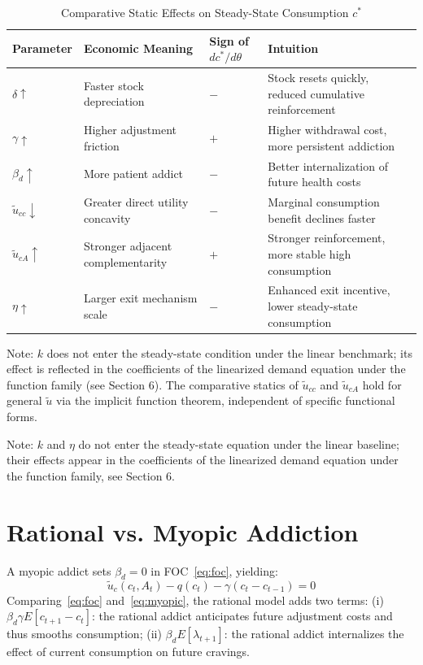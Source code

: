 \documentclass[12pt]{article}
\begin{document}
\begin{table}[h]
\centering
\caption{Comparative Static Effects on Steady-State Consumption $c^*$}
\begin{tabular}{llll}
\toprule
Parameter & Economic Meaning & Sign of $dc^*/d\theta$ & Intuition \\
\midrule
$\delta \uparrow$ & Faster stock depreciation
    & $-$ & Stock resets quickly, reduced cumulative reinforcement \\
$\gamma \uparrow$ & Higher adjustment friction
    & $+$ & Higher withdrawal cost, more persistent addiction \\
$\beta_d \uparrow$ & More patient addict
    & $-$ & Better internalization of future health costs \\
$\tilde{u}_{cc} \downarrow$ & Greater direct utility concavity
    & $-$ & Marginal consumption benefit declines faster \\
$\tilde{u}_{cA} \uparrow$ & Stronger adjacent complementarity
    & $+$ & Stronger reinforcement, more stable high consumption \\
$\eta \uparrow$ & Larger exit mechanism scale
    & $-$ & Enhanced exit incentive, lower steady-state consumption \\
\bottomrule
\end{tabular}
 
\smallskip
\footnotesize
Note: $k$ does not enter the steady-state condition under the linear benchmark; its effect is reflected in the
coefficients of the linearized demand equation under the function family (see Section 6). The comparative statics of $\tilde{u}_{cc}$ and $\tilde{u}_{cA}$
hold for general $\tilde{u}$ via the implicit function theorem, independent of specific functional forms.
\end{table}

\small Note: $k$ and $\eta$ do not enter the steady-state equation under the linear baseline;
their effects appear in the coefficients of the linearized demand equation under the function family, see Section 6.

\section{Rational vs. Myopic Addiction}

A myopic addict sets $\beta_d = 0$ in FOC~\eqref{eq:foc}, yielding:
\begin{equation}\label{eq:myopic}
\tilde{u}_c(c_t, A_t) - q(c_t) - \gamma(c_t - c_{t-1}) = 0
\end{equation}
Comparing~\eqref{eq:foc} and~\eqref{eq:myopic}, the rational model adds two terms: (i) $\beta_d\gamma E[c_{t+1} - c_t]$:
the rational addict anticipates future adjustment costs and thus smooths consumption; (ii) $\beta_d E[\lambda_{t+1}]$: the rational addict
internalizes the effect of current consumption on future cravings.
\end{document}
